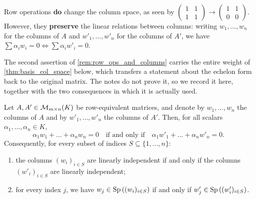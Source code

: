 \begin{importantremark}
\label{rem:row_ops_and_columns}
Row operations \textbf{do} change the column space, as seen by $\left(\begin{smallmatrix} 1 & 1 \\ 1 & 1 \end{smallmatrix}\right) \to \left(\begin{smallmatrix} 1 & 1 \\ 0 & 0 \end{smallmatrix}\right)$. However, they \textbf{preserve} the linear relations between columns: writing $w_1, \dots, w_n$ for the columns of $A$ and $w'_1, \dots, w'_n$ for the columns of $A'$, we have $\sum \alpha_{i} w_{i} = 0 \iff \sum \alpha_{i} w'_{i} = 0$.
\end{importantremark}

The second assertion of \cref{rem:row_ops_and_columns} carries the entire weight of \cref{thm:basis_col_space} below, which transfers a statement about the echelon form back to the original matrix. The notes do not prove it, so we record it here, together with the two consequences in which it is actually used.

\begin{ailemma}
\label{ailem:column_relations_preserved}
Let $A, A' \in \mathcal{M}_{m \times n}(K)$ be row-equivalent matrices, and denote by $w_{1}, \dots, w_{n}$ the columns of $A$ and by $w'_{1}, \dots, w'_{n}$ the columns of $A'$. Then, for all scalars $\alpha_{1}, \dots, \alpha_{n} \in K$,
\[
\alpha_{1} w_{1} + \dots + \alpha_{n} w_{n} = 0 \quad \text{if and only if} \quad \alpha_{1} w'_{1} + \dots + \alpha_{n} w'_{n} = 0.
\]
Consequently, for every subset of indices $S \subseteq \{1, \dots, n\}$:
\begin{enumerate}[label=\textbf{(\alph*)}]
    \item the columns $(w_{i})_{i \in S}$ are linearly independent if and only if the columns $(w'_{i})_{i \in S}$ are linearly independent;
    \item for every index $j$, we have $w_{j} \in \operatorname{Sp}\left( (w_{i})_{i \in S} \right)$ if and only if $w'_{j} \in \operatorname{Sp}\left( (w'_{i})_{i \in S} \right)$.
\end{enumerate}
\end{ailemma}

